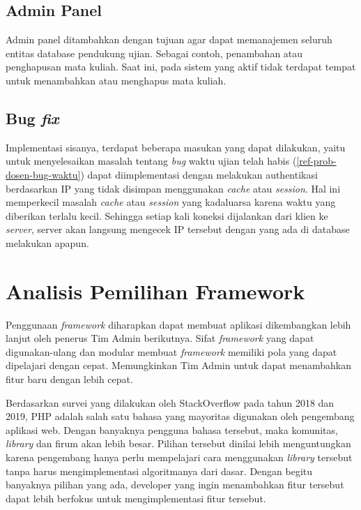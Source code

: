     \subsection{Admin Panel}
        Admin panel ditambahkan dengan tujuan agar dapat memanajemen seluruh
        entitas database pendukung ujian. Sebagai contoh, penambahan atau
        penghapusan mata kuliah. Saat ini, pada sistem yang aktif tidak terdapat
        tempat untuk menambahkan atau menghapus mata kuliah.
    
    \subsection{Bug \textit{fix}} Implementasi sisanya, terdapat beberapa
        masukan yang dapat dilakukan, yaitu untuk menyelesaikan masalah tentang
        \textit{bug} waktu ujian telah habis (\ref{ref-prob-dosen-bug-waktu})
        dapat diimplementasi dengan melakukan authentikasi berdasarkan IP yang
        tidak disimpan menggunakan \textit{cache} atau \textit{session}. Hal ini
        memperkecil masalah \textit{cache} atau \textit{session} yang kadaluarsa
        karena waktu yang diberikan terlalu kecil. Sehingga setiap kali koneksi
        dijalankan dari klien ke \textit{server}, server akan langsung mengecek
        IP tersebut dengan yang ada di database melakukan apapun.

\section{Analisis Pemilihan Framework}
Penggunaan \textit{framework} diharapkan dapat membuat aplikasi dikembangkan
lebih lanjut oleh penerus Tim Admin berikutnya. Sifat \textit{framework} yang
dapat digunakan-ulang dan modular membuat \textit{framework} memiliki pola yang
dapat dipelajari dengan cepat. Memungkinkan Tim Admin untuk dapat menambahkan
fitur baru dengan lebih cepat. 

Berdasarkan survei yang dilakukan oleh StackOverflow pada tahun
2018\cite{stackoverflow:survey-2018} dan 2019\cite{stackoverflow:survey-2019},
PHP adalah salah satu bahasa yang mayoritas digunakan oleh pengembang aplikasi
web. Dengan banyaknya pengguna bahasa tersebut, maka komunitas, \textit{library}
dan firum akan lebih besar. Pilihan tersebut dinilai lebih menguntungkan karena
pengembang hanya perlu mempelajari cara menggunakan \textit{library} tersebut
tanpa harus mengimplementasi algoritmanya dari dasar. Dengan begitu banyaknya
pilihan yang ada, developer yang ingin menambahkan fitur tersebut dapat lebih
berfokus untuk mengimplementasi fitur tersebut.

